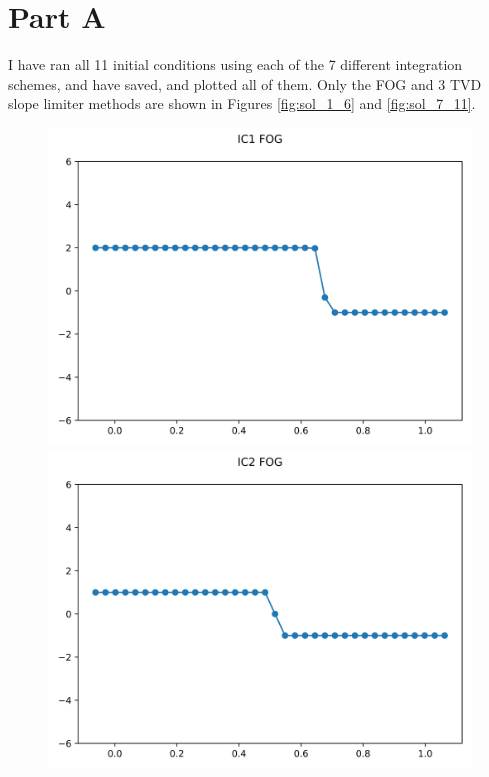 \documentclass{article}
\begin{document}
\section{Part A}

I have ran all 11 initial conditions using each of the 7 different integration
schemes, and have saved, and plotted all of them. Only the FOG and 3 TVD slope
limiter methods are shown in Figures \ref{fig:sol_1_6} and \ref{fig:sol_7_11}.

\begin{figure}[t]
        \centering
        \includegraphics[width=.95\textwidth]{../../code/IC1Methodfu_plot.png}
        \includegraphics[width=.95\textwidth]{../../code/IC2Methodfu_plot.png}

\end{figure}
\end{document}
